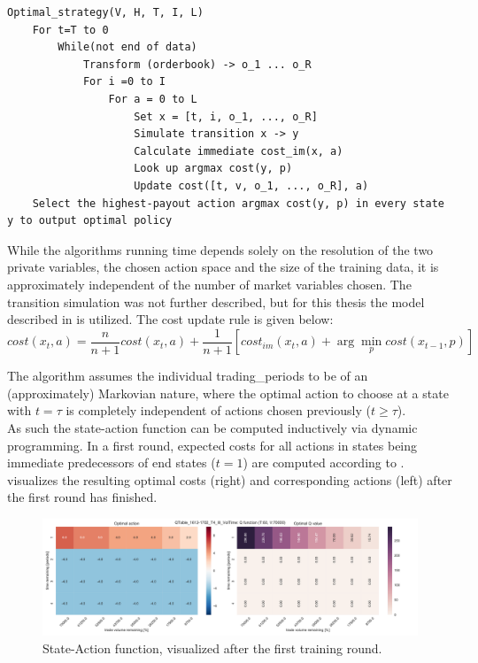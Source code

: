 \begin{lstlisting}[frame=single, breaklines=true, basicstyle=\scriptsize, caption=Brute-Force strategy learning approach as described in \Cite{Nevmyvaka:2006}., label=lst:bruteforce:pseudocode]
Optimal_strategy(V, H, T, I, L)
    For t=T to 0
        While(not end of data)
            Transform (orderbook) -> o_1 ... o_R
            For i =0 to I
                For a = 0 to L
                    Set x = [t, i, o_1, ..., o_R]
                    Simulate transition x -> y
                    Calculate immediate cost_im(x, a)
                    Look up argmax cost(y, p)
                    Update cost([t, v, o_1, ..., o_R], a)
    Select the highest-payout action argmax cost(y, p) in every state y to output optimal policy
\end{lstlisting}

While the algorithms running time depends solely on the resolution of the two private variables, the chosen action space and the size of the training data, it is approximately independent of the number of market variables chosen. The transition simulation was not further described, but for this thesis the model described in  is utilized. The cost update rule is given below: 
\begin{equation}\label{eq:costfunction}
   cost(x_t, a) = \dfrac{n}{n+1} cost(x_t, a) + \dfrac{1}{n+1} [cost_{im}(x_t,a) + \arg\min_{p}cost(x_{t-1}, p)]
\end{equation}

The algorithm assumes the individual trading\_periods to be of an (approximately) Markovian nature, where the optimal action to choose at a state with $t = \tau$ is completely independent of actions chosen previously ($t \geq \tau$).\\

As such the state-action function can be computed inductively via dynamic programming. In a first round, expected costs for all actions in states being immediate predecessors of end states (\ie $t=1$) are computed according to .  visualizes the resulting optimal costs (right) and corresponding actions (left) after the first round has finished.

\begin{figure}[ht]
	\centering
   \includegraphics[width=1.\textwidth]{content/drawings/heatmap_3months_t1}
	\caption{State-Action function, visualized after the first training round.}
	\label{fig:heatmap:t1}
\end{figure}

